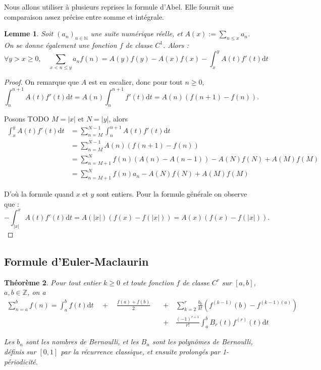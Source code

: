 \documentclass[french]{report}
\newtheorem{theorem}{Théorème}[section]
\newtheorem{lemma}[theorem]{Lemme}
\begin{document}
Nous allons utiliser à plusieurs reprises la formule d'Abel. Elle fournit une comparaison assez précise entre somme et intégrale.

\begin{lemma}\label{lem:formule-abel}
  Soit $(a_n)_{n\in\mathbb{N}}$ une suite numérique réelle, et $A(x):=\sum_{n\leq x}a_n$. On se donne également une fonction $f$ de classe $C^1$. Alors :
  \[ \forall y>x\geq0,\quad
  \sum_{x<n\leq y} a_n f(n)
  = A(y)f(y) - A(x)f(x)
  - \int_x^yA(t)f'(t)\mathrm{d}t
  \]
\end{lemma}

\begin{proof}
  On remarque que $A$ est en escalier, donc pour tout $n\geq0$,
  \[ \int_n^{n+1}A(t)f'(t)\mathrm{d}t
  = A(n)\int_n^{n+1}f'(t)\mathrm{d}t
  = A(n)(f(n+1)-f(n)).
  \]

  Posons TODO $M=|x|$ et $N=|y|$, alors
  \begin{align*}
    \int_x^yA(t)f'(t)\mathrm{d}t
    &= \sum_{n=M}^{N-1}\int_n^{n+1}A(t)f'(t)\mathrm{d}t \\
    &= \sum_{n=M}^{N-1}A(n)(f(n+1)-f(n)) \\
    &= \sum_{n=M+1}^Nf(n)(A(n)-A(n-1))-A(N)f(N)+A(M)f(M) \\
    &= \sum_{n=M+1}^Nf(n)a_n-A(N)f(N)+A(M)f(M)
  \end{align*}

  D'où la formule quand $x$ et $y$ sont entiers. Pour la formule générale on observe que :
  \[ -\int_{|x|}^xA(t)f'(t)\mathrm{d}t = A(|x|)(f(x)-f(|x|)) = A(x)(f(x)-f(|x|)). \]
  
\end{proof}

\subsection{Formule d'Euler-Maclaurin}

\begin{theorem}\label{eq:euler-maclaurin}
  Pour tout entier $k\geq0$ et toute fonction $f$ de classe $C^r$ sur $[a,b]$, $a,b\in\mathbb{Z}$, on a
  \begin{align*}
    \sum_{n=a}^b f(n) = \int_a^b f(t)\mathrm{d}t \quad + \quad \frac{f(a) + f(b)}{2} \quad &+ \quad \sum_{k=2}^r\frac{b_{k}}{k!}(f^{(k-1)}(b) - f^{(k-1)(a)}) \\
    &+ \quad \frac{(-1)^{r+1}}{r!}\int_a^b B_r(t)f^{(r)}(t)\mathrm{d}t
  \end{align*}

  Les $b_n$ sont les nombres de Bernoulli, et les $B_n$ sont les polynômes de Bernoulli, définis sur $[0,1]$ par la récurrence classique, et ensuite prolongés par 1-périodicité.
\end{theorem}
\end{document}
